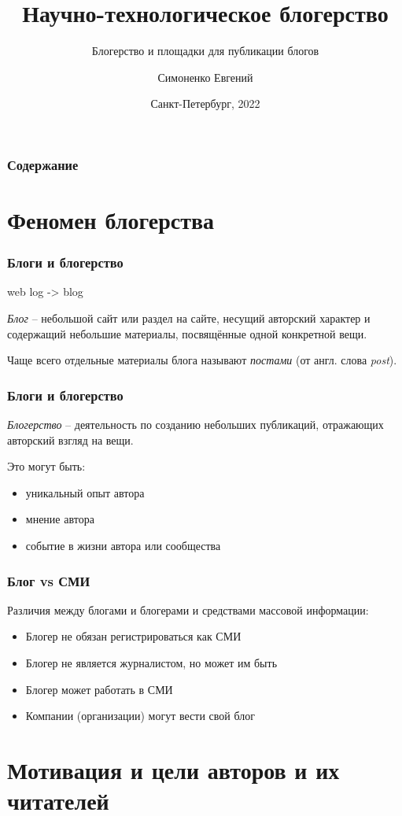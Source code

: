 \documentclass[12pt]{beamer}
\title[Блогерство]{Научно-технологическое блогерство}
\subtitle{Блогерство и площадки для публикации блогов}
\author[]{Симоненко Евгений}
\institute[]{Университет ИТМО}
\date[]{Санкт-Петербург, 2022}
\begin{document}
\begin{frame}
  \titlepage
\end{frame}

\begin{frame}
  \frametitle{Содержание}
  \tableofcontents
\end{frame}

\section{Феномен блогерства}

\begin{frame}
  \frametitle{Блоги и блогерство}
  web log -> blog

  \emph{Блог} -- небольшой сайт или раздел на сайте, несущий авторский
  характер и содержащий небольшие материалы, посвящённые одной конкретной
  вещи.

  Чаще всего отдельные материалы блога называют \emph{постами} (от англ. слова \textit{post}).
\end{frame}

\begin{frame}
  \frametitle{Блоги и блогерство}
  \emph{Блогерство} -- деятельность по созданию небольших публикаций,
  отражающих авторский взгляд на вещи.

  Это могут быть:
  \begin{itemize}
  \item уникальный опыт автора
  \item мнение автора
  \item событие в жизни автора или сообщества
  \end{itemize}
\end{frame}

\begin{frame}
  \frametitle{Блог vs СМИ}
  Различия между блогами и блогерами и средствами массовой информации:
  \begin{itemize}
  \item Блогер не обязан регистрироваться как СМИ
  \item Блогер не является журналистом, но может им быть
  \item Блогер может работать в СМИ
  \item Компании (организации) могут вести свой блог
  \end{itemize}
\end{frame}

\section{Мотивация и цели авторов и их читателей}
\end{document}
